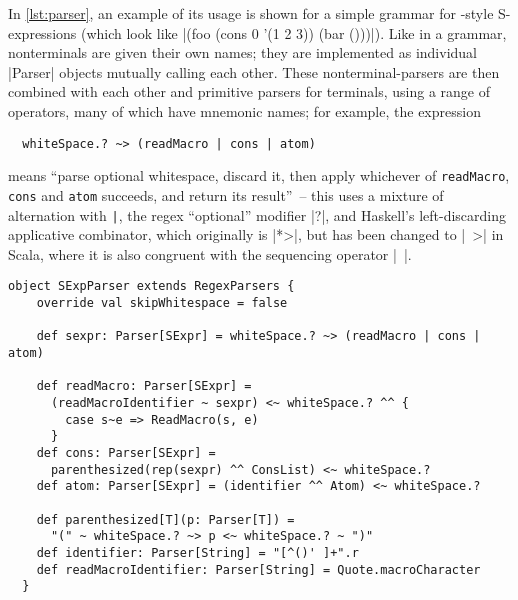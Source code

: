 In \autoref{lst:parser}, an example of its usage is shown for a simple grammar for
-style S-expressions (which look like |(foo (cons 0 '(1 2 3)) (bar ()))|). Like in a
 grammar, nonterminals are given their own names; they are implemented as individual
|Parser| objects mutually calling each other. These nonterminal-parsers are then combined with each
other and primitive parsers for terminals, using a range of operators, many of which have mnemonic
names; for example, the expression
\begin{lstlisting}
  whiteSpace.? ~> (readMacro | cons | atom)
\end{lstlisting}
means \enquote{parse optional whitespace, discard it, then apply whichever of
  \lstinline[style=inline]|readMacro|, \lstinline[style=inline]|cons| and
  \lstinline[style=inline]|atom| succeeds, and return its result}~-- this uses a mixture of
 alternation with \lstinline[style=inline]{|}, the regex \enquote{optional} modifier
|?|, and Haskell's left-discarding applicative combinator, which originally is |*>|, but has been
changed to |~>| in Scala, where it is also congruent with the sequencing operator |~|. 

\begin{lstlisting}[style=floating, label=lst:parser,
  caption={Parser for a simple S-expression syntax for \abbrev{LISP}, including quotes. The
    \lstinline|\^\^| combinator is essentially (\lstinline|f|)\lstinline|map|~-- it lifts a function
    to transform the result of a successful parser.
    \hfill\github{dsl-examples/blob/master/src/main/scala/dsl_examples/SExpParser.scala}}]
  object SExpParser extends RegexParsers {
    override val skipWhitespace = false

    def sexpr: Parser[SExpr] = whiteSpace.? ~> (readMacro | cons | atom)

    def readMacro: Parser[SExpr] = 
      (readMacroIdentifier ~ sexpr) <~ whiteSpace.? ^^ {
        case s~e => ReadMacro(s, e)
      }
    def cons: Parser[SExpr] = 
      parenthesized(rep(sexpr) ^^ ConsList) <~ whiteSpace.?
    def atom: Parser[SExpr] = (identifier ^^ Atom) <~ whiteSpace.?

    def parenthesized[T](p: Parser[T]) = 
      "(" ~ whiteSpace.? ~> p <~ whiteSpace.? ~ ")"
    def identifier: Parser[String] = "[^()' ]+".r
    def readMacroIdentifier: Parser[String] = Quote.macroCharacter
  }
\end{lstlisting}

